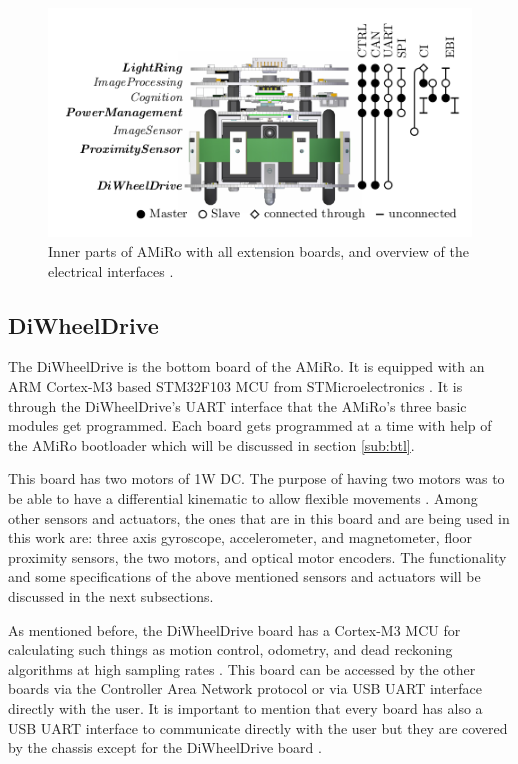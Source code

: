 \documentclass[12pt]{report}%
\begin{document}
\begin{figure}[h]
	\centering
	\includegraphics[width=\textwidth]{amiro_schematic}
    \caption{Inner parts of AMiRo with all extension boards, and overview of the electrical interfaces \cite{AMiRo_paper_modular}.}
    \label{fig:schemat}
\end{figure}
\clearpage

\subsection{DiWheelDrive}
\label{sub:DWD}
The DiWheelDrive is the bottom board of the AMiRo. It is equipped with an ARM Cortex-M3 based STM32F103 MCU from STMicroelectronics \cite{AMiRo_paper_modular}. It is through the DiWheelDrive's UART interface that the AMiRo's three basic modules get programmed. Each board gets programmed at a time with help of the AMiRo bootloader which will be discussed in section \ref{sub:btl}.

This board has two motors of 1W DC. The purpose of having two motors was to be able to have a differential kinematic to allow flexible movements \cite{AMiRo_paper_modular}. Among other sensors and actuators, the ones that are in this board and are being used in this work are: three axis gyroscope, accelerometer, and magnetometer, floor proximity sensors, the two motors, and optical motor encoders. The functionality and some specifications of the above mentioned sensors and actuators will be discussed in the next subsections.

As mentioned before, the DiWheelDrive board has a Cortex-M3 MCU for calculating such things as motion control, odometry, and dead reckoning algorithms at high sampling rates \cite{AMiRo_paper_modular}. This board can be accessed by the other boards via the Controller Area Network protocol or via USB UART interface directly with the user. It is important to mention that every board has also a USB UART interface to communicate directly with the user but they are covered by the chassis except for the DiWheelDrive board \cite{AMiRo_paper_modular}.
\end{document}
